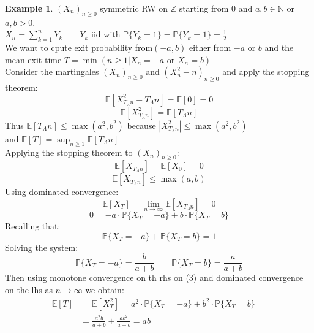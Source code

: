 \documentclass[10pt,a4paper]{article}
\theoremstyle{definition}
\newtheorem{exi}{Example}[section]
\begin{document}
\begin{exi}
	$(X_n)_{n\geq0}$ symmetric RW on $\mathbb{Z}$ starting from $0$ and $a,b\in\mathbb{N}$ or $a,b>0$.\\
	$X_n=\sum_{k=1}^{n}Y_k \qquad Y_k$ iid with $\mathbb{P}\{Y_k=1\}=\mathbb{P}\{Y_k=1\}=\frac{1}{2}$ \\
	We want to cpute exit probability from$(-a,b)$ either from $-a$ or $b$ and the mean exit time $T=\min{(n\geq1|X_n=-a \text{ or } X_n=b)}$ \\
	Consider the martingales $(X_n)_{n\geq0}$ and $(X^2_n-n)_{n\geq0}$ and apply the stopping theorem: 
	\begin{equation*}
		\mathbb{E}[X^2_{T_{\Lambda}n}-T_{\Lambda}n]=\mathbb{E}[0]=0
	\end{equation*}
	\begin{equation}
		\mathbb{E}[X^2_{T_{\Lambda}n}]=\mathbb{E}[T_{\Lambda}n]
	\end{equation}
Thus $ \mathbb{E}[T_{\Lambda}n]\leq\max{(a^2,b^2)} $ because $  |X^2_{T_{\Lambda}n}|\leq\max{(a^2,b^2)}$ \\
	and $\mathbb{E}[T]=\sup_{n\geq1}\mathbb{E}[T_{\Lambda}n]$\\
	Applying the stopping theorem to $(X_n)_{n\geq0}$:
	\begin{equation*}
		\mathbb{E}[X_{T_{\Lambda}n}]=\mathbb{E}[X_0]=0
	\end{equation*}
\begin{equation*}
	\mathbb{E}[X_{T_{\Lambda}n}]\leq\max{(a,b)}
\end{equation*}                                                 
Using dominated convergence:                                    
\begin{equation*}                                               
	\mathbb{E}[X_{T}]=\lim_{n\to\infty}\mathbb{E}[X_{T_{\Lambda}n}]=0
\end{equation*}
\begin{equation*}                                               
	0=-a\cdot\mathbb{P}\{X_T=-a\}+b\cdot\mathbb{P}\{X_T=b\}
\end{equation*}
Recalling that:
\begin{equation*}                                               
	\mathbb{P}\{X_T=-a\}+\mathbb{P}\{X_T=b\}=1
\end{equation*}
Solving the system:
\begin{equation*}                                               
	\mathbb{P}\{X_T=-a\}=\frac{b}{a+b} \qquad \mathbb{P}\{X_T=b\}=\frac{a}{a+b}
\end{equation*}
Then using monotone convergence on th rhs on (3) and dominated convergence on the lhs as $n\to\infty$ we obtain:
\begin{equation*}  
	\begin{split}
		\mathbb{E}[T]&=\mathbb{E}[X^2_T]=a^2\cdot\mathbb{P}\{X_T=-a\}+b^2\cdot\mathbb{P}\{X_T=b\}=\\&=\frac{a^2b}{a+b}+\frac{ab^2}{a+b}=ab
	\end{split}                                             
\end{equation*}
\end{exi}
\end{document}
